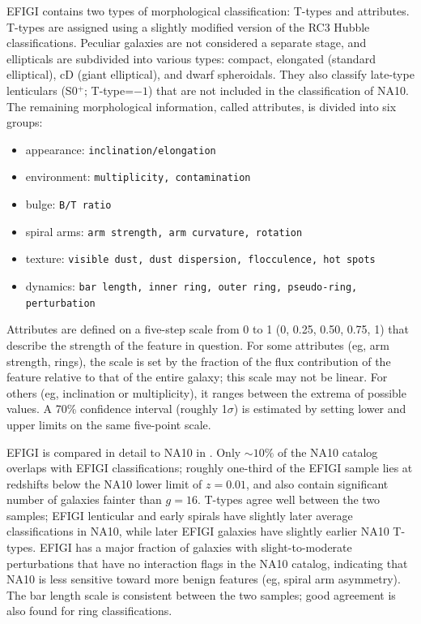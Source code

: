 \documentclass[useAMS,usenatbib]{mn2e}
\begin{document}
EFIGI contains two types of morphological classification: T-types and attributes. T-types are assigned using a slightly modified version of the RC3 Hubble classifications. Peculiar galaxies are not considered a separate stage, and ellipticals are subdivided into various types: compact, elongated (standard elliptical), cD (giant elliptical), and dwarf spheroidals. They also classify late-type lenticulars (S0$^+$; T-type=$-1$) that are not included in the classification of NA10. The remaining morphological information, called attributes, is divided into six groups:

\begin{itemize}
	\item appearance: {\tt inclination/elongation }
	\item environment: {\tt multiplicity, contamination}
	\item bulge: {\tt B/T ratio}
	\item spiral arms: {\tt arm strength, arm curvature, rotation}
	\item texture: {\tt visible dust, dust dispersion, flocculence, hot spots}
	\item dynamics: {\tt bar length, inner ring, outer ring, pseudo-ring, perturbation}
\end{itemize}

\noindent Attributes are defined on a five-step scale from 0 to 1 (0, 0.25, 0.50, 0.75, 1) that describe the strength of the feature in question. For some attributes (eg, arm strength, rings), the scale is set by the fraction of the flux contribution of the feature relative to that of the entire galaxy; this scale may not be linear. For others (eg, inclination or multiplicity), it ranges between the extrema of possible values. A 70\% confidence interval (roughly 1$\sigma$) is estimated by setting lower and upper limits on the same five-point scale.

EFIGI is compared in detail to NA10 in \citet{bai11}. Only $\sim10\%$ of the NA10 catalog overlaps with EFIGI classifications; roughly one-third of the EFIGI sample lies at redshifts below the NA10 lower limit of $z=0.01$, and also contain significant number of galaxies fainter than $g=16$. T-types agree well between the two samples; EFIGI lenticular and early spirals have slightly later average classifications in NA10, while later EFIGI galaxies have slightly earlier NA10 T-types. EFIGI has a major fraction of galaxies with slight-to-moderate perturbations that have no interaction flags in the NA10 catalog, indicating that NA10 is less sensitive toward more benign features (eg, spiral arm asymmetry). The bar length scale is consistent between the two samples; good agreement is also found for ring classifications. 
\end{document}

